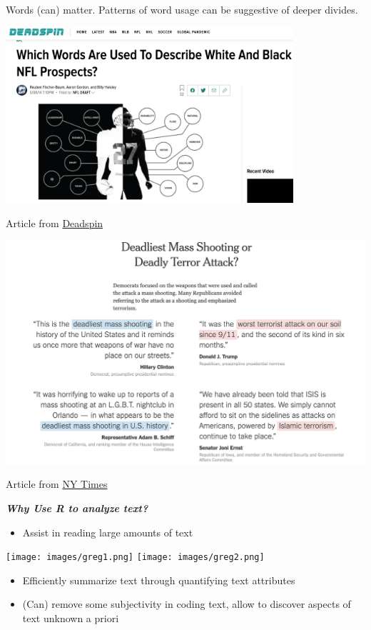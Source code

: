 \documentclass[
  letterpaper,
  DIV=11,
  numbers=noendperiod]{scrreprt}
\providecommand{\tightlist}{%
  \setlength{\itemsep}{0pt}\setlength{\parskip}{0pt}}\usepackage{longtable,booktabs,array}
\begin{document}
Words (can) matter. Patterns of word usage can be suggestive of deeper
divides.

\includegraphics[width=0.8\textwidth,height=\textheight]{images/deadspin.png}

Article from
\href{https://deadspin.com/which-words-are-used-to-describe-white-and-black-nfl-pr-1573683214}{Deadspin}

\includegraphics{images/wordsmass.png}

Article from
\href{https://www.nytimes.com/interactive/2016/06/13/us/politics/politicians-respond-to-orlando-nightclub-attack.html}{NY
Times}

\textbf{\emph{Why Use R to analyze text?}}

\begin{itemize}
\tightlist
\item
  Assist in reading large amounts of text
\end{itemize}

\texttt{[image: images/greg1.png]}
\texttt{[image: images/greg2.png]}

\begin{itemize}
\tightlist
\item
  Efficiently summarize text through quantifying text attributes
\item
  (Can) remove some subjectivity in coding text, allow to discover
  aspects of text unknown a priori
\end{itemize}
\end{document}
